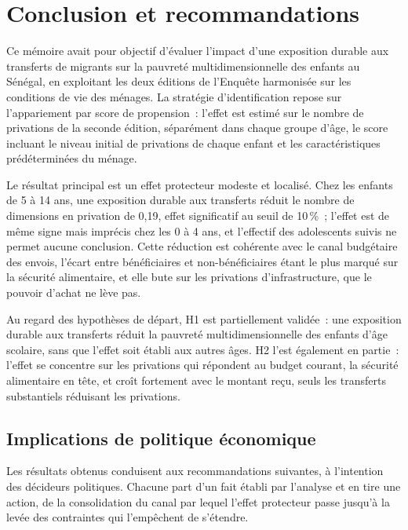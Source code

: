 \section*{Conclusion et recommandations}

Ce mémoire avait pour objectif d'évaluer l'impact d'une exposition durable
aux transferts de migrants sur la pauvreté multidimensionnelle des enfants
au Sénégal, en exploitant les deux éditions de l'Enquête harmonisée sur
les conditions de vie des ménages. La stratégie d'identification repose
sur l'appariement par score de propension~: l'effet est estimé sur le
nombre de privations de la seconde édition, séparément dans chaque groupe
d'âge, le score incluant le niveau initial de privations de chaque enfant
et les caractéristiques prédéterminées du ménage.

Le résultat principal est un effet protecteur modeste et localisé. Chez
les enfants de 5 à 14 ans, une exposition durable aux transferts réduit le
nombre de dimensions en privation de 0,19, effet significatif au seuil de
10\,\%~; l'effet est de même signe mais imprécis chez les 0 à 4 ans, et
l'effectif des adolescents suivis ne permet aucune conclusion. Cette
réduction est cohérente avec le canal budgétaire des envois, l'écart entre
bénéficiaires et non-bénéficiaires étant le plus marqué sur la sécurité
alimentaire, et elle bute sur les privations d'infrastructure, que le
pouvoir d'achat ne lève pas.

Au regard des hypothèses de départ, H1 est partiellement validée~: une
exposition durable aux transferts réduit la pauvreté multidimensionnelle
des enfants d'âge scolaire, sans que l'effet soit établi aux autres âges.
H2 l'est également en partie~: l'effet se concentre sur les privations qui
répondent au budget courant, la sécurité alimentaire en tête, et croît
fortement avec le montant reçu, seuls les transferts substantiels
réduisant les privations.

\subsection*{Implications de politique économique}

Les résultats obtenus conduisent aux recommandations suivantes, à
l'intention des décideurs politiques. Chacune part d'un fait établi par
l'analyse et en tire une action, de la consolidation du canal par lequel
l'effet protecteur passe jusqu'à la levée des contraintes qui l'empêchent
de s'étendre.

